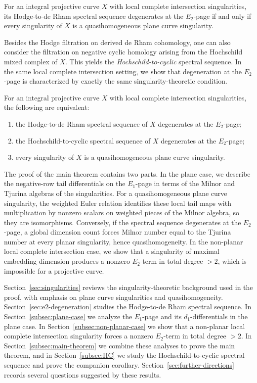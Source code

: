 \documentclass[12pt,reqno]{amsart}
\begin{document}
\begin{theorem}
For an integral projective curve \(X\) with local complete intersection singularities, its Hodge-to-de Rham spectral sequence degenerates at the \(E_2\)-page if and only if every singularity of \(X\) is a quasihomogeneous plane curve singularity.
\end{theorem}

Besides the Hodge filtration on derived de Rham cohomology, one can also consider the filtration on negative cyclic homology arising from the Hochschild mixed complex of \(X\). This yields the \emph{Hochschild-to-cyclic} spectral sequence. In the same local complete intersection setting, we show that degeneration at the \(E_2\)-page is characterized by exactly the same singularity-theoretic condition.

\begin{corollary}
For an integral projective curve \(X\) with local complete intersection singularities, the following are equivalent:
\begin{enumerate}
\item the Hodge-to-de Rham spectral sequence of \(X\) degenerates at the \(E_2\)-page;
\item the Hochschild-to-cyclic spectral sequence of \(X\) degenerates at the \(E_2\)-page;
\item every singularity of \(X\) is a quasihomogeneous plane curve singularity.
\end{enumerate}
\end{corollary}

The proof of the main theorem contains two parts. In the plane case, we describe the negative-row tail differentials on the \(E_1\)-page in terms of the Milnor and Tjurina algebras of the singularities. For a quasihomogeneous plane curve singularity, the weighted Euler relation identifies these local tail maps with multiplication by nonzero scalars on weighted pieces of the Milnor algebra, so they are isomorphisms. Conversely, if the spectral sequence degenerates at the \(E_2\)-page, a global dimension count forces Milnor number equal to the Tjurina number at every planar singularity, hence quasihomogeneity. In the non-planar local complete intersection case, we show that a singularity of maximal embedding dimension produces a nonzero \(E_2\)-term in total degree \(>2\), which is impossible for a projective curve. 

Section~\ref{sec:singularities} reviews the singularity-theoretic background used in the proof, with emphasis on plane curve singularities and quasihomogeneity. Section~\ref{sec:e2-degeneration} studies the Hodge-to-de Rham spectral sequence. In Section~\ref{subsec:plane-case} we analyze the \(E_1\)-page and its \(d_1\)-differentials in the plane case. In Section~\ref{subsec:non-planar-case} we show that a non-planar local complete intersection singularity forces a nonzero \(E_2\)-term in total degree \(>2\). In Section~\ref{subsec:main-theorem} we combine these analyses to prove the main theorem, and in Section~\ref{subsec:HC} we study the Hochschild-to-cyclic spectral sequence and prove the companion corollary. Section~\ref{sec:further-directions} records several questions suggested by these results.
\end{document}
